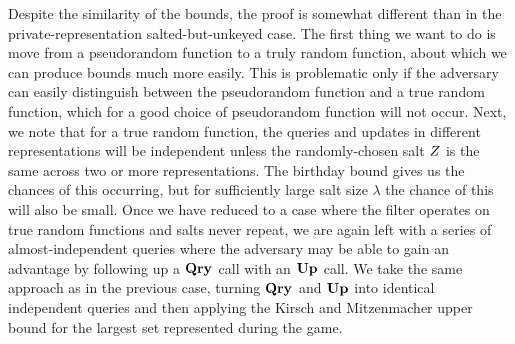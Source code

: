 Despite the similarity of the bounds, the proof is somewhat different than in the private-representation salted-but-unkeyed case. The first thing we want to do is move from a pseudorandom function to a truly random function, about which we can produce bounds much more easily. This is problematic only if the adversary can easily distinguish between the pseudorandom function and a true random function, which for a good choice of pseudorandom function will not occur. Next, we note that for a true random function, the queries and updates in different representations will be independent unless the randomly-chosen salt $Z$ is the same across two or more representations. The birthday bound gives us the chances of this occurring, but for sufficiently large salt size $\lambda$ the chance of this will also be small. Once we have reduced to a case where the filter operates on true random functions and salts never repeat, we are again left with a series of almost-independent queries where the adversary may be able to gain an advantage by following up a $\mathbf{Qry}\hspace{0.5pt}$ call with an $\mathbf{Up}\hspace{0.5pt}$ call. We take the same approach as in the previous case, turning $\mathbf{Qry}\hspace{0.5pt}$ and $\mathbf{Up}\hspace{0.5pt}$ into identical independent queries and then applying the Kirsch and Mitzenmacher upper bound for the largest set represented during the game.

